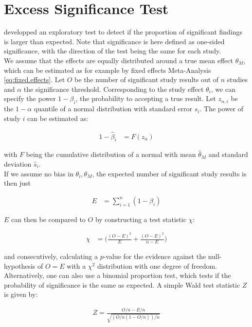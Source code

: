 \section{Excess Significance Test}
\citet{excess.significance} developped an exploratory test to detect if the proportion of significant findings is larger than expected. Note that significance is here defined as one-sided significance, with the direction of the test being the same for each study. \\
We assume that the effects are equally distributed around a true mean effect $\theta_M$, which can be estimated as for example by fixed effects Meta-Analysis \ref{eq:fixed.effects}. Let $O$ be the number of significant study results out of $n$ studies and $\alpha$ the significance threshold. Corresponding to the study effect $\theta_i$, we can specify the power $1 - \beta_i$, the probability to accepting a true result. Let $z_{\alpha,i}$ be the $1-\alpha$ quantile of a normal distribution with standard error $\hat{s}_i$. The power of study $i$ can be estimated as:

\begin{align}
1 - \hat{\beta}_i &= F(z_\alpha) 
\end{align}

with $F$ being the cumulative distribution of a normal with mean $\hat{\theta}_M$ and standard deviation $\hat{s}_i$. \\
If we assume no bias in $\theta_i, \theta_M$, the expected number of significant study results is then just

\begin{align}
E &= \sum_{i = 1}^n (1 - \beta_i) \nonumber
\end{align}

$E$ can then be compared to $O$ by constructing a test statistic $\chi$:

\begin{align}
\chi  &= \big( \frac{(O - E)^2}{E} + \frac{(O - E)^2}{n - E}\big) \nonumber
\end{align}

and consecutively, calculating a $p$-value for the evidence against the null-hypothesis of $O = E$ with a $\chi^2$ distribution with one degree of freedom. Alternatively, one can also use a binomial proportion test, which tests if the probability of significance is the same as expected. A simple Wald test statistic $Z$ is given by:

\begin{align}
Z = \frac{O/n - E/n}{\sqrt{(O/n(1-O/n))/n}}
\end{align}

